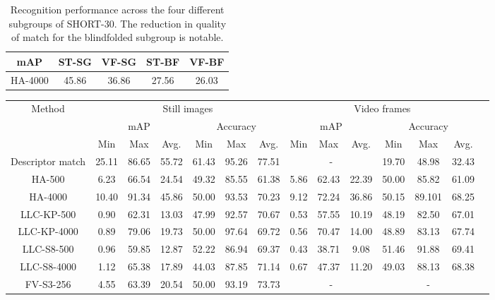 \begin{table}[]
\centering
  \begin{tabular}{ccccc}
   \toprule
    mAP & ST-SG & VF-SG & ST-BF & VF-BF \\
	\midrule
    HA-4000                    & 45.86    & 36.86   & 27.56 & 26.03\\
	\bottomrule
    \end{tabular}
    \caption{Recognition performance across the four different subgroups of SHORT-30. The reduction in quality of match for the blindfolded subgroup is notable.}
    \label{table:sightedVSblindfolded}
\end{table}


\begin{table}
\centering
\begin{adjustbox}{max width=1.2\textwidth,center}
\begin{tabular}{cccccccccccccc}
   \toprule
\multirow{3}{*}{Method} & \multicolumn{6}{c}{Still images} & \multicolumn{6}{c}{Video frames}\\
\cline{2-13} 
 &  \multicolumn{3}{c}{mAP} & \multicolumn{3}{c}{Accuracy} & \multicolumn{3}{c}{mAP} & \multicolumn{3}{c}{ Accuracy}\\
& Min & Max & Avg. & Min & Max & Avg. & Min & Max & Avg. & Min & Max & Avg.\\
\hline \hline 
Descriptor match & 25.11 & 86.65 & 55.72 & 61.43 & 95.26 & 77.51 & \multicolumn{3}{c}{-} & 19.70 & 48.98 & 32.43\\
\hline
HA-500 & 6.23 & 66.54 & 24.54 & 49.32 & 85.55 & 61.38 & 5.86 & 62.43 & 22.39 &50.00 & 85.82 & 61.09\\
\hline
HA-4000 & 10.40 & 91.34 & 45.86 & 50.00 & 93.53 & 70.23 & 9.12 & 72.24 & 36.86 & 50.15 & 89.101 & 68.25 \\
\hline
LLC-KP-500 & 0.90 & 62.31 & 13.03 & 47.99 & 92.57 & 70.67  & 0.53 & 57.55 & 10.19 & 48.19 & 82.50 & 67.01\\
\hline
LLC-KP-4000 & 0.89 & 79.06 & 19.73 & 50.00 & 97.64 & 69.72 & 0.56 & 70.47 & 14.00 & 48.89 & 83.13 & 67.74 \\
\hline
LLC-S8-500 & 0.96 & 59.85 & 12.87 & 52.22 & 86.94 & 69.37 & 0.43 & 38.71 & 9.08 & 51.46 & 91.88 & 69.41\\
\hline
LLC-S8-4000 & 1.12 & 65.38 & 17.89 & 44.03 & 87.85 & 71.14 & 0.67 & 47.37 & 11.20 & 49.03 & 88.13 & 68.38\\
\hline
FV-S3-256 & 4.55 & 63.39 & 20.54 & 50.00 & 93.19 & 73.73 & \multicolumn{3}{c}{-} & \multicolumn{3}{c}{-}\\

\end{tabular}
\end{adjustbox}
\end{table}
